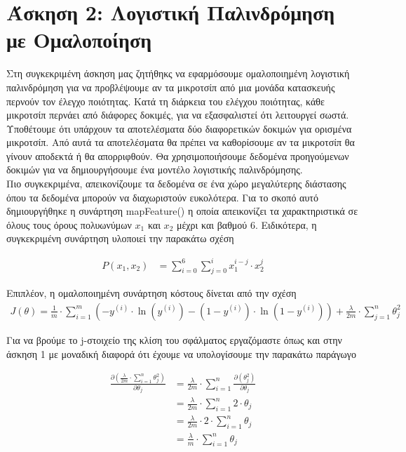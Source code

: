 \documentclass{article}
\begin{document}
	
\section*{Άσκηση 2: Λογιστική Παλινδρόμηση με Ομαλοποίηση}
	Στη συγκεκριμένη άσκηση μας ζητήθηκς να εφαρμόσουμε ομαλοποιημένη λογιστική παλινδρόμηση για να προβλέψουμε αν τα μικροτσίπ από μια μονάδα κατασκευής περνούν τον έλεγχο ποιότητας. Κατά τη διάρκεια του ελέγχου ποιότητας, κάθε μικροτσίπ περνάει από διάφορες δοκιμές, για να εξασφαλιστεί ότι λειτουργεί σωστά. \\
	
	\noindent
	Υποθέτουμε ότι υπάρχουν τα αποτελέσματα δύο διαφορετικών δοκιμών για ορισμένα μικροτσίπ. Από αυτά τα αποτελέσματα θα πρέπει να καθορίσουμε αν τα μικροτσίπ θα γίνουν αποδεκτά ή θα απορριφθούν. Θα χρησιμοποιήσουμε δεδομένα	προηγούμενων δοκιμών για να δημιουργήσουμε ένα μοντέλο λογιστικής παλινδρόμησης. \\
	
	\noindent
	Πιο συγκεκριμένα, απεικονίζουμε τα δεδομένα σε ένα χώρο μεγαλύτερης διάστασης όπου τα δεδομένα μπορούν να διαχωριστούν ευκολότερα. Για το σκοπό αυτό δημιουργήθηκε η συνάρτηση mapFeature() η οποία απεικονίζει τα χαρακτηριστικά σε όλους τους όρους πολυωνύμων $x_{1}$ και $x_{2}$ μέχρι και βαθμού 6. Ειδικότερα, η συγκεκριμένη συνάρτηση υλοποιεί την παρακάτω σχέση
	
	\begin{align*}
		P(x_{1},x_{2}) &= \sum_{i=0}^{6} \sum_{j=0}^{i} x^{i-j}_{1} \cdot x^{j}_{2}
	\end{align*}
	
	\noindent
	Επιπλέον, η ομαλοποιημένη συνάρτηση κόστους δίνεται από την σχέση
	\begin{align*}
		J(θ) = \frac{1}{m} \cdot \sum_{i=1}^{m}  \left (-y^{(i)} \cdot \ln(y^{(i)}) - (1-y^{(i)}) \cdot \ln (1 - y^{(i)}) \right) + \frac{λ}{2 m} \cdot \sum_{j=1}^{n} θ_{j}^{2} 
	\end{align*}

	\noindent
	Για να βρούμε το j-στοιχείο της κλίση του σφάλματος εργαζόμαστε όπως και στην άσκηση 1 με μοναδική διαφορά ότι έχουμε να υπολογίσουμε την παρακάτω παράγωγο
	
	\begin{align*}
		\frac{\partial \left(\frac{λ}{2 m} \cdot  \sum_{i=1}^{n} θ_{j}^{2} \right)}{\partial θ_{j}}
		&= \frac{λ}{2 m} \cdot \sum_{i=1}^{n} \frac{\partial \left( θ_{j}^{2} \right)}{\partial θ_{j}} \\
		&= \frac{λ}{2 m} \cdot \sum_{i=1}^{n} 2 \cdot θ_{j} \\
		&= \frac{λ}{2 m} \cdot 2 \cdot \sum_{i=1}^{n}  θ_{j} \\
		&= \frac{λ}{m} \cdot \sum_{i=1}^{n}  θ_{j}
	\end{align*}
\end{document}

